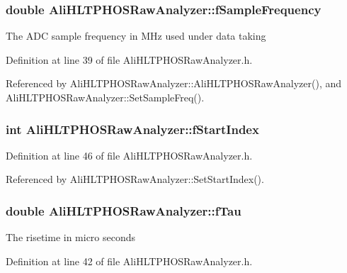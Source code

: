 \subsubsection{\setlength{\rightskip}{0pt plus 5cm}double {\bf Ali\-HLTPHOSRaw\-Analyzer::f\-Sample\-Frequency}\hspace{0.3cm}{\tt  [protected, inherited]}}\label{classAliHLTPHOSRawAnalyzer_AliHLTPHOSRawAnalyzerPeakFinderp1}


The ADC sample frequency in MHz used under data taking 

Definition at line 39 of file Ali\-HLTPHOSRaw\-Analyzer.h.

Referenced by Ali\-HLTPHOSRaw\-Analyzer::Ali\-HLTPHOSRaw\-Analyzer(), and Ali\-HLTPHOSRaw\-Analyzer::Set\-Sample\-Freq().
\subsubsection{\setlength{\rightskip}{0pt plus 5cm}int {\bf Ali\-HLTPHOSRaw\-Analyzer::f\-Start\-Index}\hspace{0.3cm}{\tt  [protected, inherited]}}\label{classAliHLTPHOSRawAnalyzer_AliHLTPHOSRawAnalyzerPeakFinderp7}




Definition at line 46 of file Ali\-HLTPHOSRaw\-Analyzer.h.

Referenced by Ali\-HLTPHOSRaw\-Analyzer::Set\-Start\-Index().
\subsubsection{\setlength{\rightskip}{0pt plus 5cm}double {\bf Ali\-HLTPHOSRaw\-Analyzer::f\-Tau}\hspace{0.3cm}{\tt  [protected, inherited]}}\label{classAliHLTPHOSRawAnalyzer_AliHLTPHOSRawAnalyzerPeakFinderp4}


The risetime in micro seconds 

Definition at line 42 of file Ali\-HLTPHOSRaw\-Analyzer.h.
